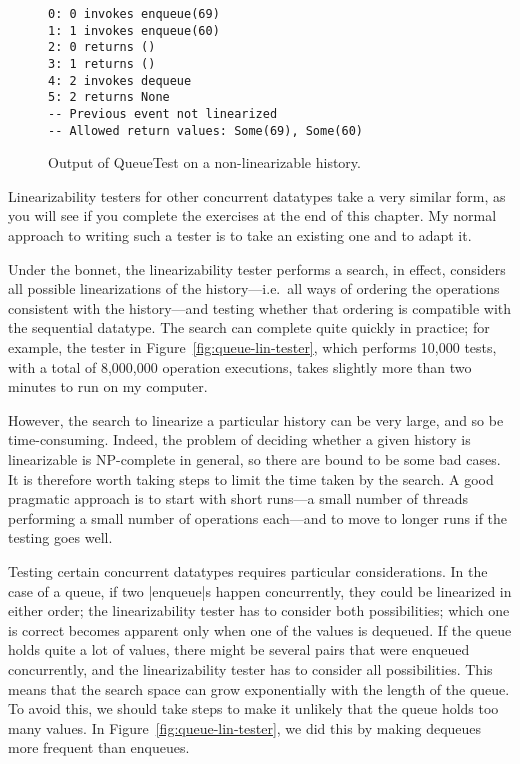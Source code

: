 
\begin{figure}
\begin{verbatim}
0: 0 invokes enqueue(69)
1: 1 invokes enqueue(60)
2: 0 returns ()
3: 1 returns ()
4: 2 invokes dequeue
5: 2 returns None
-- Previous event not linearized
-- Allowed return values: Some(69), Some(60)
\end{verbatim}
\caption{Output of {\scalashape QueueTest} on a non-linearizable history.}
\label{fig:lin-testing-error}
\end{figure}


Linearizability testers for other concurrent datatypes take a very similar
form, as you will see if you complete the exercises at the end of this
chapter.  My normal approach to writing such a tester is to take an existing
one and to adapt it.

Under the bonnet, the linearizability tester performs a search, in effect,
considers all possible linearizations of the history---i.e.~all ways of
ordering the operations consistent with the history---and testing whether that
ordering is compatible with the sequential datatype.  The search can complete
quite quickly in practice; for example, the tester in
Figure~\ref{fig:queue-lin-tester}, which performs 10,000 tests, with a total
of 8,000,000 operation executions, takes slightly more than two minutes to run
on my computer.

However, the search to linearize a particular history can be very large, and
so be time-consuming.  Indeed, the problem of deciding whether a given history
is linearizable is NP-complete in general, so there are bound to be some bad
cases.  It is therefore worth taking steps to limit the time taken by the
search.  A good pragmatic approach is to start with short runs---a small
number of threads performing a small number of operations each---and to move
to longer runs if the testing goes well.

Testing certain concurrent datatypes requires particular considerations.  In
the case of a queue, if two |enqueue|s happen concurrently, they could be
linearized in either order; the linearizability tester has to consider both
possibilities; which one is correct becomes apparent only when one of the
values is dequeued.  If the queue holds quite a lot of values, there might be
several pairs that were enqueued concurrently, and the linearizability tester
has to consider all possibilities.  This means that the search space can grow
exponentially with the length of the queue.  To avoid this, we should take
steps to make it unlikely that the queue holds too many values.  In
Figure~\ref{fig:queue-lin-tester}, we did this by making dequeues more
frequent than enqueues.

